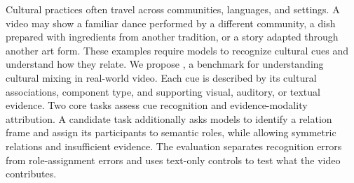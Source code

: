 Cultural practices often travel across communities, languages, and settings.
A video may show a familiar dance performed by a different community, a dish prepared with ingredients from another tradition, or a story adapted through another art form.
These examples require models to recognize cultural cues and understand how they relate.
We propose \benchmark{}, a benchmark for understanding cultural mixing in real-world video.
Each cue is described by its cultural associations, component type, and supporting visual, auditory, or textual evidence.
Two core tasks assess cue recognition and evidence-modality attribution.
A candidate task additionally asks models to identify a relation frame and assign its participants to semantic roles, while allowing symmetric relations and insufficient evidence.
The evaluation separates recognition errors from role-assignment errors and uses text-only controls to test what the video contributes.
